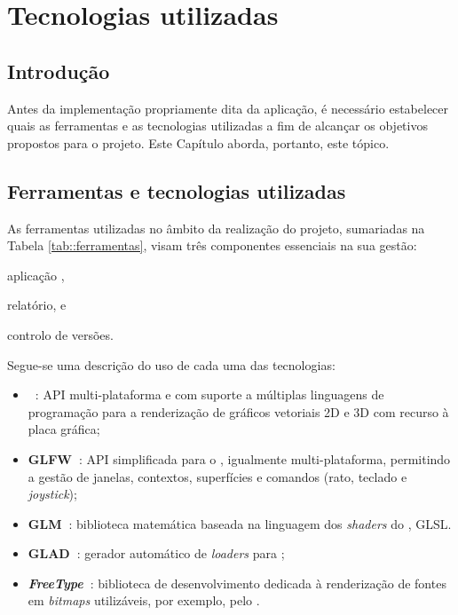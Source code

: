 \chapter{Tecnologias utilizadas}
\label{ch::tecno}


\section{Introdução}
\label{sec::tecno:intro}

Antes da implementação propriamente dita da aplicação, é necessário estabelecer quais as ferramentas e as tecnologias utilizadas a fim de alcançar os objetivos propostos para o projeto. Este Capítulo aborda, portanto, este tópico.


\section{Ferramentas e tecnologias utilizadas}
\label{sec::tecno:tecnologia}

As ferramentas utilizadas no âmbito da realização do projeto, sumariadas na Tabela \ref{tab::ferramentas}, visam três componentes essenciais na sua gestão:
\begin{inparaenum}[1)]
	\item aplicação \opengl,
	\item relatório, e
	\item controlo de versões.
\end{inparaenum}

Segue-se uma descrição do uso de cada uma das tecnologias:

\begin{itemize}
    \item \textbf{\opengl~\cite{opengl}}: \ac{API} multi-plataforma e com suporte a múltiplas linguagens de programação para a renderização de gráficos vetoriais 2D e 3D com recurso à placa gráfica;
    
    \item \textbf{GLFW~\cite{glfw}}: \ac{API} simplificada para o \opengl, igualmente multi-plataforma, permitindo a gestão de janelas, contextos, superfícies e comandos (rato, teclado e \textit{joystick});
    
    \item \textbf{GLM~\cite{glm}}: biblioteca matemática baseada na linguagem dos \textit{shaders} do \opengl, \ac{GLSL}.
    
    \item \textbf{\ac{GLAD}~\cite{glad,glad-webservice}}: gerador automático de \textit{loaders} para \opengl;
    
    \item \textbf{\textit{FreeType}~\cite{freetype}}: biblioteca de desenvolvimento dedicada à renderização de fontes em \textit{bitmaps} utilizáveis, por exemplo, pelo \opengl.
\end{itemize}

